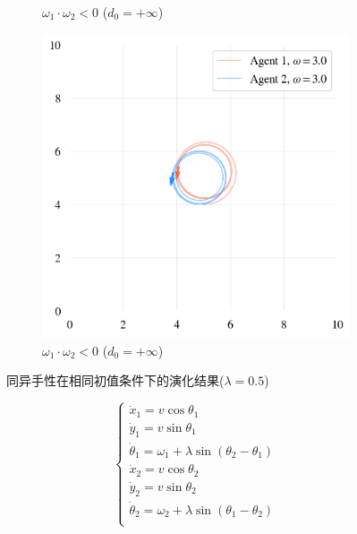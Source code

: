 \documentclass{article}
\begin{document}
\begin{figure}[H]
\begin{subfigure}[b]{0.49\textwidth}
		\vspace{-1cm}
		\caption{$\omega_1 \cdot \omega_2 < 0$ ($d_0=+\infty$)}
	\end{subfigure}
	\begin{subfigure}[b]{0.49\textwidth}
		\includegraphics[width=\textwidth]{./figs/sameChirInf.png}
		\vspace{-1cm}
		\caption{$\omega_1 \cdot \omega_2 < 0$ ($d_0=+\infty$)}
	\end{subfigure}
	\caption{同异手性在相同初值条件下的演化结果($\lambda=0.5$)}
	\label{fig:fig2.6.chir}
\end{figure}

$$
\begin{cases}
	\dot{x}_1=v\cos \theta _1\\
	\dot{y}_1=v\sin \theta _1\\
	\dot{\theta}_1=\omega _1+\lambda \sin \left( \theta _2-\theta _1 \right)\\
	\dot{x}_2=v\cos \theta _2\\
	\dot{y}_2=v\sin \theta _2\\
	\dot{\theta}_2=\omega _2+\lambda \sin \left( \theta _1-\theta _2 \right)\\
\end{cases}
$$


\newpage
\end{document}

